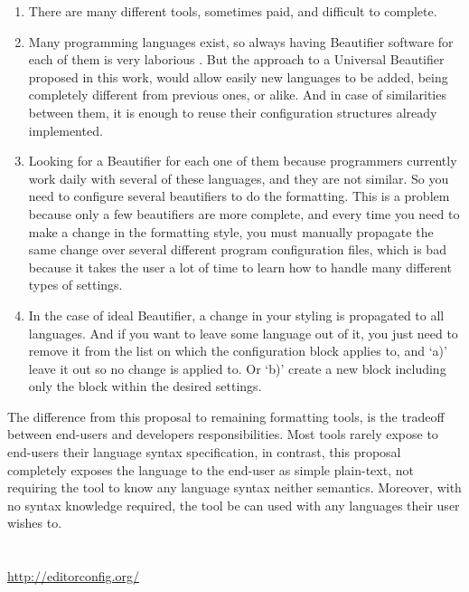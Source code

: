\begin{enumerate}[leftmargin=*]
    \item
        There are many different tools, sometimes paid, and difficult to
        complete. \cite{universalCodeFormatter}
    \item
        Many programming languages exist, so always having Beautifier
        software for each of them is very laborious
        \cite{universalCodeFormatter}. But the approach to a Universal
        Beautifier proposed in this work, would allow easily new languages to be
        added, being completely different from previous ones, or alike. And in
        case of similarities between them, it is enough to reuse their
        configuration structures already implemented.
    \item
        Looking for a Beautifier for each one of them because programmers
        currently work daily with several of these languages, and they are not
        similar. So you need to configure several beautifiers to do the
        formatting. This is a problem because only a few beautifiers are more
        complete, and every time you need to make a change in the formatting
        style, you must manually propagate the same change over several
        different program configuration files, which is bad because it takes the
        user a lot of time to learn how to handle many different types of
        settings. \cite{Schweitzer}
    \item
        In the case of ideal Beautifier, a change in your styling is
        propagated to all languages. And if you want to leave some language out
        of it, you just need to remove it from the list on which the
        configuration block applies to, and `a)' leave it out so no change is
        applied to. Or `b)' create a new block including only the block within
        the desired settings.
\end{enumerate}

    The difference from this proposal to remaining formatting tools,
    is the tradeoff between end\hyp{}users and developers responsibilities.
    Most tools rarely expose to end\hyp{}users their language syntax specification,
    in contrast,
    this proposal completely exposes the language to the end\hyp{}user as simple plain\hyp{}text,
    not requiring the tool to know any language syntax neither semantics.
    Moreover,
    with no syntax knowledge required,
    the tool be can used with any languages their user wishes to.



\section{}

\url{http://editorconfig.org/}

